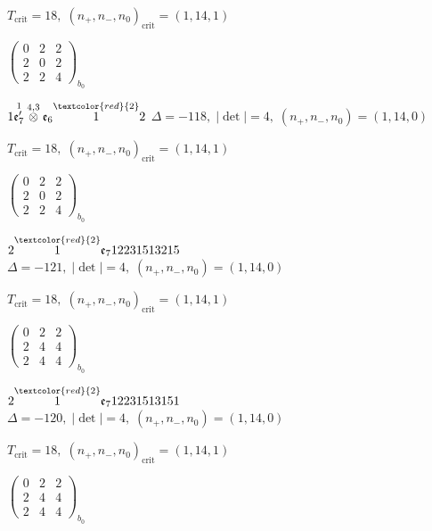 \documentclass[10pt]{article}
\begin{document}
\hspace{1em}$T_{\text{crit}}=18,\; (n_+,n_-,n_0)_{\text{crit}}=(1,14,1)$

\hspace{2em}$\left(\begin{smallmatrix}0 & 2 & 2 \\ 2 & 0 & 2 \\ 2 & 2 & 4\end{smallmatrix}\right)_{\!b_0}$

\smallskip

$1\overset{1}{\mathfrak{e}_7'}\overset{4,3}{\otimes}\mathfrak{e}_6\overset{\textcolor{red}{2}}{1}2$ \quad $\Delta=-118,\; |\det|=4,\; (n_+,n_-,n_0)=(1,14,0)$

\hspace{1em}$T_{\text{crit}}=18,\; (n_+,n_-,n_0)_{\text{crit}}=(1,14,1)$

\hspace{2em}$\left(\begin{smallmatrix}0 & 2 & 2 \\ 2 & 0 & 2 \\ 2 & 2 & 4\end{smallmatrix}\right)_{\!b_0}$

\smallskip

$2\overset{\textcolor{red}{2}}{1}\mathfrak{e}_712231513215$ \quad $\Delta=-121,\; |\det|=4,\; (n_+,n_-,n_0)=(1,14,0)$

\hspace{1em}$T_{\text{crit}}=18,\; (n_+,n_-,n_0)_{\text{crit}}=(1,14,1)$

\hspace{2em}$\left(\begin{smallmatrix}0 & 2 & 2 \\ 2 & 4 & 4 \\ 2 & 4 & 4\end{smallmatrix}\right)_{\!b_0}$

\smallskip

$2\overset{\textcolor{red}{2}}{1}\mathfrak{e}_712231513151$ \quad $\Delta=-120,\; |\det|=4,\; (n_+,n_-,n_0)=(1,14,0)$

\hspace{1em}$T_{\text{crit}}=18,\; (n_+,n_-,n_0)_{\text{crit}}=(1,14,1)$

\hspace{2em}$\left(\begin{smallmatrix}0 & 2 & 2 \\ 2 & 4 & 4 \\ 2 & 4 & 4\end{smallmatrix}\right)_{\!b_0}$
\end{document}
